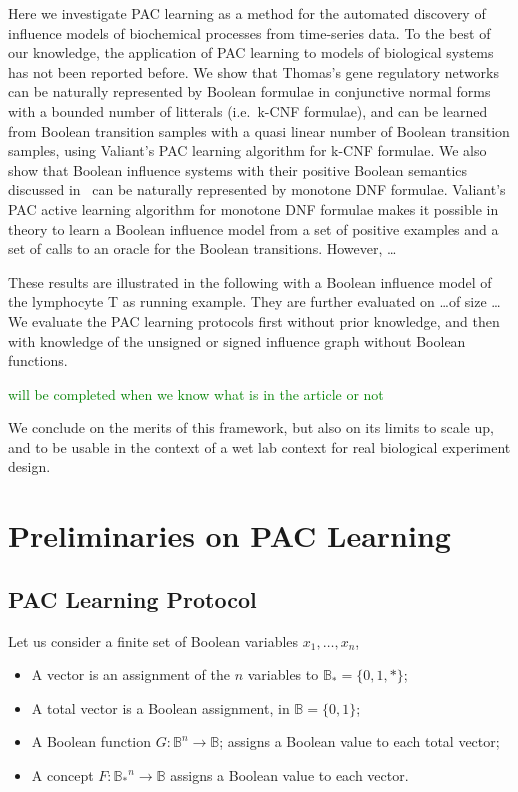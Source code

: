 \documentclass{llncs}
\newcommand{\sylvain}[1]{\textcolor{green}{#1}}
\begin{document}
Here we investigate PAC learning as a method for the automated discovery of influence models of biochemical processes from time-series data. 
To the best of our knowledge, 
the application of PAC learning to models of biological systems has not been reported before.
We show that Thomas's gene regulatory networks~\cite{Thomas91jtb,Thomas73jtb} can be naturally represented by 
Boolean formulae in conjunctive normal forms with a bounded number of litterals (i.e.~k-CNF formulae),
and can be learned from Boolean transition samples with a quasi linear number of Boolean transition samples, using Valiant's PAC learning algorithm for k-CNF formulae.
We also show that Boolean influence systems with their positive Boolean semantics discussed in~\cite{FMRS16cmsb}
can be naturally represented by monotone DNF formulae.
Valiant's PAC active learning algorithm for monotone DNF formulae makes it possible in theory 
to learn a Boolean influence model from a set of positive examples and a set of calls to an oracle for the Boolean transitions.
However, \dots

These results are illustrated in the following with a Boolean influence model of the lymphocyte T as running example.
They are further evaluated on \dots of size \dots
We evaluate the PAC learning protocols first without prior knowledge, and then with knowledge of the unsigned or signed influence graph without Boolean functions.

\sylvain{will be completed when we know what is in the article or not}

We conclude on the merits of this framework, but also on its limits to scale up,
and to be usable in the context of a wet lab context for real biological experiment design.


\section{Preliminaries on PAC Learning}\label{pac}

\subsection{PAC Learning Protocol}


Let us consider a finite set of Boolean variables $x_1,\ldots,x_n$,
\begin{itemize}
	\item A vector is an assignment of the $n$ variables to $\mathbb{B}_* = \{0,1,*\}$;
	\item A total vector is a Boolean assignment, in $\mathbb{B} = \{0,1\}$;
	\item A Boolean function $G:{\mathbb{B}}^n \rightarrow \mathbb{B}$;
	assigns a Boolean value to each total vector;
\item A concept $F:{\mathbb{B}_*}^n \rightarrow \mathbb{B}$
	assigns a Boolean value to each vector.
\end{itemize}
\end{document}
